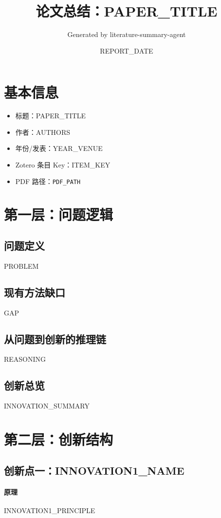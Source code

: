 \documentclass[11pt]{ctexart}
\title{论文总结：{{PAPER_TITLE}}}
\author{Generated by literature-summary-agent}
\date{{{REPORT_DATE}}}
\begin{document}
\maketitle

\section{基本信息}
\begin{itemize}[leftmargin=1.5em]
  \item 标题：{{PAPER_TITLE}}
  \item 作者：{{AUTHORS}}
  \item 年份/发表：{{YEAR_VENUE}}
  \item Zotero 条目 Key：{{ITEM_KEY}}
  \item PDF 路径：\texttt{{{PDF_PATH}}}
\end{itemize}

\section{第一层：问题逻辑}
\subsection{问题定义}
{{PROBLEM}}

\subsection{现有方法缺口}
{{GAP}}

\subsection{从问题到创新的推理链}
{{REASONING}}

\subsection{创新总览}
{{INNOVATION_SUMMARY}}

\section{第二层：创新结构}
\subsection{创新点一：{{INNOVATION1_NAME}}}
\paragraph{原理}
{{INNOVATION1_PRINCIPLE}}
\end{document}
